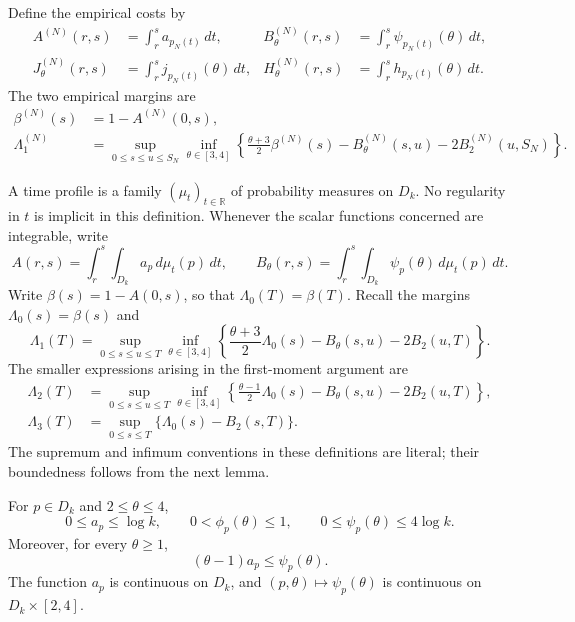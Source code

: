 Define the empirical costs by
\begin{align*}
 A^{(N)}(r,s)&=\int_r^s a_{p_N(t)}\,dt,&
 B^{(N)}_\theta(r,s)&=\int_r^s\psi_{p_N(t)}(\theta)\,dt,\\
 J^{(N)}_\theta(r,s)&=\int_r^s j_{p_N(t)}(\theta)\,dt,&
 H^{(N)}_\theta(r,s)&=\int_r^s h_{p_N(t)}(\theta)\,dt.
\end{align*}
The two empirical margins are
\begin{align}\label{eq:empirical-margins}
 \beta^{(N)}(s)&=1-A^{(N)}(0,s),\nonumber\\
 \Lambda_1^{(N)}&=\sup_{0\le s\le u\le S_N}\inf_{\theta\in[3,4]}
 \left\{\frac{\theta+3}{2}\beta^{(N)}(s)
       -B^{(N)}_\theta(s,u)-2B^{(N)}_2(u,S_N)\right\}.
\end{align}

A time profile is a family $(\mu_t)_{t\in\mathbb R}$ of probability
measures on $D_k$. No regularity in $t$ is implicit in this definition.
Whenever the scalar functions concerned are integrable, write
\[
 A(r,s)=\int_r^s\int_{D_k}a_p\,d\mu_t(p)\,dt,\qquad
 B_\theta(r,s)=\int_r^s\int_{D_k}\psi_p(\theta)\,d\mu_t(p)\,dt.
\]
Write $\beta(s)=1-A(0,s)$, so that $\Lambda_0(T)=\beta(T)$.
Recall the margins $\Lambda_0(s)=\beta(s)$ and
\begin{equation}\label{eq:macro-margin}
 \Lambda_1(T)=\sup_{0\le s\le u\le T}\inf_{\theta\in[3,4]}
 \left\{\frac{\theta+3}{2}\Lambda_0(s)
             -B_\theta(s,u)-2B_2(u,T)\right\}.
\end{equation}
The smaller expressions arising in the first-moment argument are
\begin{align}\label{eq:auxiliary-margins}
 \Lambda_2(T)&=\sup_{0\le s\le u\le T}\inf_{\theta\in[3,4]}
 \left\{\frac{\theta-1}{2}\Lambda_0(s)
             -B_\theta(s,u)-2B_2(u,T)\right\},\nonumber\\
 \Lambda_3(T)&=\sup_{0\le s\le T}\{\Lambda_0(s)-B_2(s,T)\}.
\end{align}
The supremum and infimum conventions in these definitions are literal;
their boundedness follows from the next lemma.

\begin{lemma}\label{lem:scalar-bounds}
For $p\in D_k$ and $2\le\theta\le4$,
\[
 0\le a_p\le\log k,\qquad
 0<\phi_p(\theta)\le1,\qquad
 0\le\psi_p(\theta)\le4\log k.
\]
Moreover, for every $\theta\ge1$,
\begin{equation}\label{eq:one-column-dominance}
 (\theta-1)a_p\le\psi_p(\theta).
\end{equation}
The function $a_p$ is continuous on $D_k$, and
$(p,\theta)\mapsto\psi_p(\theta)$ is continuous on $D_k\times[2,4]$.
\end{lemma}

